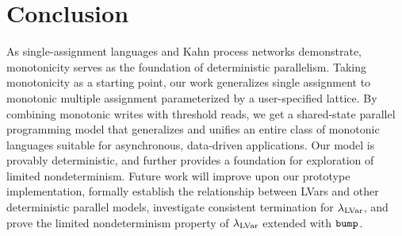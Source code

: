 \section{Conclusion}


As single-assignment languages and Kahn process networks demonstrate,
monotonicity serves as the foundation of deterministic parallelism.
Taking monotonicity as a starting point, our work generalizes single
assignment to monotonic multiple assignment parameterized by a
user-specified lattice.  By combining monotonic writes with threshold
reads, we get a shared-state parallel programming model that
generalizes and unifies an entire class of monotonic languages
suitable for asynchronous, data-driven applications.  Our model is
provably deterministic, and further provides a foundation for
exploration of limited nondeterminism.  Future work will improve upon
our prototype implementation, formally establish the relationship between
LVars and other deterministic parallel models,
investigate consistent termination for $\lambda_{\textrm{LVar}}$,
and prove the
limited nondeterminism property of $\lambda_{\textrm{LVar}}$ extended with $\mbox{\texttt{bump}}$.


